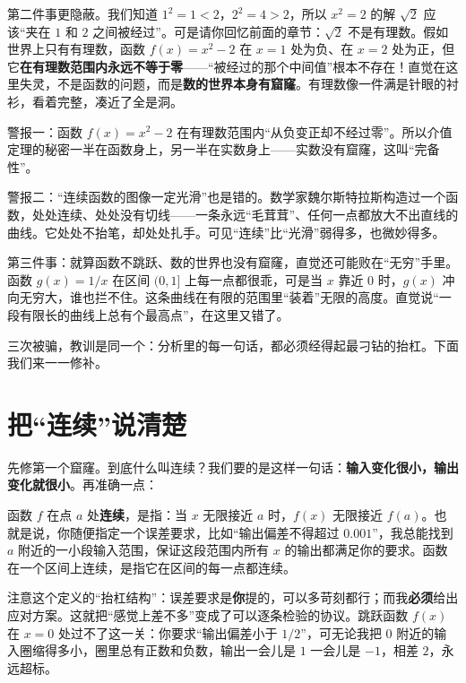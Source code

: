 第二件事更隐蔽。我们知道 $1^2=1<2$，$2^2=4>2$，所以 $x^2=2$ 的解 $\sqrt{2}$ 应该“夹在 $1$ 和 $2$ 之间被经过”。可是请你回忆前面的章节：$\sqrt{2}$ 不是有理数。假如世界上只有有理数，函数 $f(x)=x^2-2$ 在 $x=1$ 处为负、在 $x=2$ 处为正，但它\textbf{在有理数范围内永远不等于零}——“被经过的那个中间值”根本不存在！直觉在这里失灵，不是函数的问题，而是\textbf{数的世界本身有窟窿}。有理数像一件满是针眼的衬衫，看着完整，凑近了全是洞。

\begin{fanli}
警报一：函数 $f(x)=x^2-2$ 在有理数范围内“从负变正却不经过零”。所以介值定理的秘密一半在函数身上，另一半在实数身上——实数没有窟窿，这叫“完备性”。

警报二：“连续函数的图像一定光滑”也是错的。数学家魏尔斯特拉斯构造过一个函数，处处连续、处处没有切线——一条永远“毛茸茸”、任何一点都放大不出直线的曲线。它处处不抬笔，却处处扎手。可见“连续”比“光滑”弱得多，也微妙得多。
\end{fanli}

第三件事：就算函数不跳跃、数的世界也没有窟窿，直觉还可能败在“无穷”手里。函数 $g(x)=1/x$ 在区间 $(0,1]$ 上每一点都很乖，可是当 $x$ 靠近 $0$ 时，$g(x)$ 冲向无穷大，谁也拦不住。这条曲线在有限的范围里“装着”无限的高度。直觉说“一段有限长的曲线上总有个最高点”，在这里又错了。

三次被骗，教训是同一个：分析里的每一句话，都必须经得起最刁钻的抬杠。下面我们来一一修补。

\section{把“连续”说清楚}

先修第一个窟窿。到底什么叫连续？我们要的是这样一句话：\textbf{输入变化很小，输出变化就很小}。再准确一点：

\begin{dingyi}[连续（直观版）]
函数 $f$ 在点 $a$ 处\textbf{连续}，是指：当 $x$ 无限接近 $a$ 时，$f(x)$ 无限接近 $f(a)$。也就是说，你随便指定一个误差要求，比如“输出偏差不得超过 $0.001$”，我总能找到 $a$ 附近的一小段输入范围，保证这段范围内所有 $x$ 的输出都满足你的要求。函数在一个区间上连续，是指它在区间的每一点都连续。
\end{dingyi}

注意这个定义的“抬杠结构”：误差要求是\textbf{你}提的，可以多苛刻都行；而我\textbf{必须}给出应对方案。这就把“感觉上差不多”变成了可以逐条检验的协议。跳跃函数 $f(x)$ 在 $x=0$ 处过不了这一关：你要求“输出偏差小于 $1/2$”，可无论我把 $0$ 附近的输入圈缩得多小，圈里总有正数和负数，输出一会儿是 $1$ 一会儿是 $-1$，相差 $2$，永远超标。


